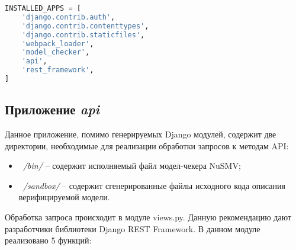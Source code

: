 \begin{lstlisting}[language=Python, 
				   label=lst:config, 
				   caption={Фрагмент конфигурационного файла Django.}]
INSTALLED_APPS = [
	'django.contrib.auth',
	'django.contrib.contenttypes',
	'django.contrib.staticfiles',
	'webpack_loader',
	'model_checker',
	'api',
	'rest_framework',
]
\end{lstlisting}

\subsection{Приложение \textit{api}}

Данное приложение, помимо генерируемых Django модулей, содержит две директории, необходимые для реализации обработки запросов к методам API:

\begin{itemize}
	\item \textit{~/bin/} -- содержит исполняемый файл модел-чекера NuSMV;
	\item \textit{~/sandbox/} -- содержит сгенерированные файлы исходного кода описания верифицируемой модели.
\end{itemize}

Обработка запроса происходит в модуле views.py. Данную рекомендацию дают разработчики библиотеки Django REST Framework. В данном модуле реализовано 5 функций:

